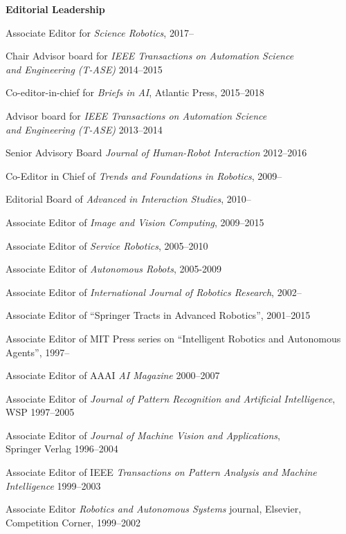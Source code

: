 \documentclass{article}
\begin{document}
\begin{cv}
\begin{cvlist} {\bf Editorial Leadership} 
  \item Associate Editor for {\em Science Robotics}, \cftdotfill{\cftdotsep} 2017--
  \item Chair Advisor board for {\em IEEE Transactions on Automation
    Science\\ and Engineering (T-ASE)}  \cftdotfill{\cftdotsep} 2014--2015
  \item Co-editor-in-chief for {\em Briefs in AI}, Atlantic Press,
    \cftdotfill{\cftdotsep}  2015--2018
  \item Advisor board for {\em IEEE Transactions on Automation
    Science\\ and Engineering (T-ASE)} \cftdotfill{\cftdotsep} 2013--2014
  \item Senior Advisory Board {\em Journal of Human-Robot Interaction}
    \cftdotfill{\cftdotsep} 2012--2016
  \item Co-Editor in Chief of {\em Trends and Foundations in
    Robotics}, \cftdotfill{\cftdotsep} 2009--
  \item Editorial Board of {\em Advanced in Interaction
    Studies},\cftdotfill{\cftdotsep} 2010--
  \item Associate Editor of {\em Image and Vision
    Computing},\cftdotfill{\cftdotsep} 2009--2015
  \item Associate Editor of {\em Service Robotics},
    \cftdotfill{\cftdotsep} 2005--2010
  \item Associate Editor of {\em Autonomous Robots},
    \cftdotfill{\cftdotsep} 2005-2009
  \item Associate Editor of {\em International Journal of Robotics
    Research},\cftdotfill{\cftdotsep} 2002--
  \item Associate Editor of ``Springer Tracts in Advanced
    Robotics'',\cftdotfill{\cftdotsep} 2001--2015
  \item Associate Editor of MIT Press series on ``Intelligent Robotics
    and Autonomous\\ Agents'',\cftdotfill{\cftdotsep} 1997--
  \item Associate Editor of AAAI {\em AI
    Magazine}\cftdotfill{\cftdotsep} 2000--2007
  \item Associate Editor of {\em Journal of Pattern Recognition and
    Artificial Intelligence},\\ WSP \cftdotfill{\cftdotsep} 1997--2005
  \item Associate Editor of {\em Journal of Machine Vision and
    Applications}, \\Springer Verlag \cftdotfill{\cftdotsep}
    1996--2004
  \item Associate Editor of IEEE {\em Transactions on Pattern Analysis
    and Machine\\ Intelligence} \cftdotfill{\cftdotsep} 1999--2003
  \item Associate Editor {\em Robotics and Autonomous Systems}
    journal, Elsevier, \\Competition Corner, \cftdotfill{\cftdotsep}
    1999--2002
\end{cvlist}


\end{cv}
\end{document}

